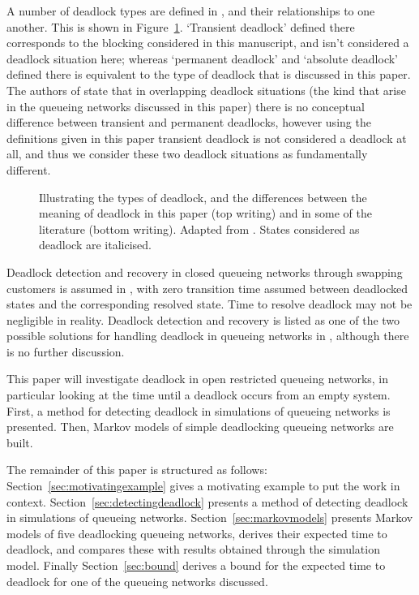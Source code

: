 \documentclass{article}
\numberwithin{equation}{section}
\begin{document}
A number of deadlock types are defined in \cite{venkateshetal98}, and their relationships to one another.
This is shown in Figure~\ref{fig:deadlocktypes}.
`Transient deadlock' defined there corresponds to the blocking considered in this manuscript, and isn't considered a deadlock situation here; whereas `permanent deadlock' and `absolute deadlock' defined there is equivalent to the type of deadlock that is discussed in this paper.
The authors of \cite{venkateshetal98} state that in overlapping deadlock situations (the kind that arise in the queueing networks discussed in this paper) there is no conceptual difference between transient and permanent deadlocks, however using the definitions given in this paper transient deadlock is not considered a deadlock at all, and thus we consider these two deadlock situations as fundamentally different.

\begin{figure}[!htbp]
  \begin{center}
  
  \end{center}
  \caption{Illustrating the types of deadlock, and the differences between the meaning of deadlock in this paper (top writing) and in some of the literature (bottom writing). Adapted from \cite{venkateshetal98}. States considered as deadlock are italicised.}
  \label{fig:deadlocktypes}
\end{figure}

Deadlock detection and recovery in closed queueing networks through swapping customers is assumed in \cite{perrosetal88}, with zero transition time assumed between deadlocked states and the corresponding resolved state.
Time to resolve deadlock may not be negligible in reality.
Deadlock detection and recovery is listed as one of the two possible solutions for handling deadlock in queueing networks in \cite{akyildiz89}, although there is no further discussion.

This paper will investigate deadlock in open restricted queueing networks, in particular looking at the time until a deadlock occurs from an empty system.
First, a method for detecting deadlock in simulations of queueing networks is presented.
Then, Markov models of simple deadlocking queueing networks are built.

The remainder of this paper is structured as follows: Section~\ref{sec:motivatingexample} gives a motivating example to put the work in context.
Section~\ref{sec:detectingdeadlock} presents a method of detecting deadlock in simulations of queueing networks.
Section~\ref{sec:markovmodels} presents Markov models of five deadlocking queueing networks, derives their expected time to deadlock, and compares these with results obtained through the simulation model.
Finally Section~\ref{sec:bound} derives a bound for the expected time to deadlock for one of the queueing networks discussed.
\end{document}
